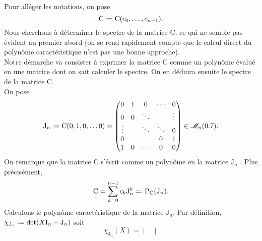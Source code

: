 \begin{preuve}
    Pour alléger les notations, on pose 
    $$\mathrm{C} \defeq \mathrm{C}(c_0, \dots, c_{n-1}).$$
    Nous cherchons à déterminer le spectre de la matrice $\mathrm{C}$, ce qui ne semble pas évident au premier abord (on se rend rapidement compte que le calcul direct du polynôme caractéristique n'est pas une bonne approche). \\
    Notre démarche va consister à exprimer la matrice $\mathrm{C}$ comme un polynôme évalué en une matrice dont on sait calculer le spectre. On en déduira ensuite le spectre de la matrice $\mathrm{C}$. \\
    On pose 
    $$
    \mathrm{J}_n \defeq \mathrm{C}(0, 1, 0, \dots 0) = 
    \begin{pmatrix}
    0 & 1 & 0 & \cdots & 0 \\
    0 & 0 & \ddots & & \vdots \\
    \vdots & & \ddots & \ddots & 0 \\
    0 & & & 0 & 1 \\
    1 & 0 & \cdots & 0 & 0
    \end{pmatrix} \in \M_n(\R).
    $$
    On remarque que la matrice $\mathrm{C}$ s'écrit comme un polynôme en la matrice $\mathrm{J}_n$ \note. Plus précisément, 
    $$\mathrm{C} = \sum_{k=0}^{n-1} c_k \mathrm{J}_n^k \defeqright \mathrm{P}_{\mathrm{C}}(\mathrm{J}_n).$$
    Calculons le polynôme caractéristique de la matrice $\mathrm{J}_n$. Par définition, $\chi_{\mathrm{J}_n} \defeq \det(X \I_n - \mathrm{J}_n)$ soit 
    $$
        \chi_{\mathrm{J}_n}(X) = 
        \begin{vmatrix}

\end{vmatrix}$$
\end{preuve}
